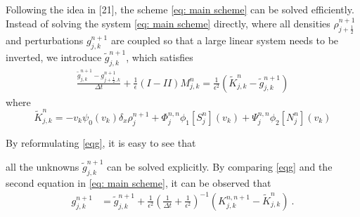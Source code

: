 \documentclass[11pt,twoside]{article}
\begin{document}
Following the idea in [21], the scheme \eqref{eq: main scheme} can be solved efficiently. Instead of solving the system \eqref{eq: main scheme} directly, where all densities $\rho_{j+\frac{1}{2}}^{n+1}$ and perturbations $g_{j,k}^{n+1}$ are coupled so that a large linear system needs to be inverted, we introduce $\tilde{g}_{j,k}^{n+1}$, which satisfies
\begin{eqnarray}\label{eqg}
    \frac{\tilde{g}_{j,k}^{n+1}-g_{j+\frac{1}{2},k}^{n+1}}{\Delta t}+\frac{1}{\epsilon}(I-II)M_{j,k}^n=\frac{1}{\epsilon^2}(\widetilde{K}_{j,k}^{n}-\tilde{g}_{j,k}^{n+1})
\end{eqnarray}
where
$$
\widetilde{K}_{j,k}^{n}=-v_k\psi_0(v_k)\delta_x\rho_{j}^{n+1}+{\Phi^{n,n}_{j}\phi_1[S_{j}^n](v_k)+\Psi^{n,n}_{j}\phi_2[N_{j}^n](v_k)}
$$

By reformulating \eqref{eqg}, it is easy to see that

 all the unknowns $\tilde{g}_{j,k}^{n+1}$ can be solved explicitly. By comparing \eqref{eqg} and the second equation in \eqref{eq: main scheme}, it can be observed that 
\begin{align}\label{g}
    g_{j,k}^{n+1}
    &=\tilde{g}_{j,k}^{n+1}+\frac{1}{\epsilon^2}\left(\frac{1}{\Delta t}+\frac{1}{\epsilon^2}\right)^{-1}\left( K_{j,k}^{n,n+1}-\widetilde{K}_{j,k}^n \right)\ .
\end{align}
\end{document}
